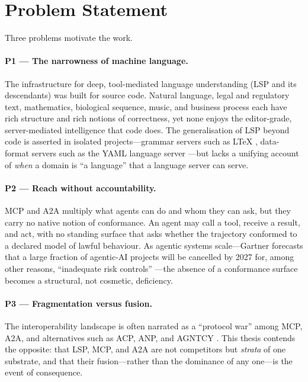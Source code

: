 \section{Problem Statement}
\label{sec:problem}

Three problems motivate the work.

\paragraph{P1 --- The narrowness of machine language.} The infrastructure for
deep, tool-mediated language understanding (LSP and its descendants) was built
for source code. Natural language, legal and regulatory text, mathematics,
biological sequence, music, and business process each have rich structure and
rich notions of correctness, yet none enjoys the editor-grade, server-mediated
intelligence that code does. The generalisation of LSP beyond code is asserted in
isolated projects---grammar servers such as LTeX \citep{ltex}, data-format
servers such as the YAML language server \citep{yamlls}---but lacks a unifying
account of \emph{when} a domain is ``a language'' that a language server can
serve.

\paragraph{P2 --- Reach without accountability.} MCP and A2A multiply what
agents can do and whom they can ask, but they carry no native notion of
conformance. An agent may call a tool, receive a result, and act, with no
standing surface that asks whether the trajectory conformed to a declared model
of lawful behaviour. As agentic systems scale---Gartner forecasts that a large
fraction of agentic-AI projects will be cancelled by 2027 for, among other
reasons, ``inadequate risk controls'' \citep{gartner-agentic-2025}---the absence
of a conformance surface becomes a structural, not cosmetic, deficiency.

\paragraph{P3 --- Fragmentation versus fusion.} The interoperability landscape is
often narrated as a ``protocol war'' among MCP, A2A, and alternatives such as
ACP, ANP, and AGNTCY \citep{acp-a2a-merge,anp-github,agntcy-cisco}. This thesis
contends the opposite: that LSP, MCP, and A2A are not competitors but
\emph{strata} of one substrate, and that their fusion---rather than the dominance
of any one---is the event of consequence.

